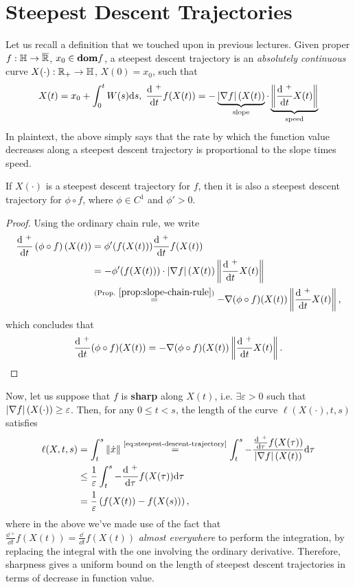 \section{Steepest Descent Trajectories}

Let us recall a definition that we touched upon in previous lectures. Given
proper $f: \mathbb{H} \to \overline{\mathbb{R}}$, $x_0 \in \textbf{dom} f$, a steepest descent
trajectory is an \textit{absolutely continuous} curve $X(\cdot): \mathbb{R}_+ \to
\mathbb{H}$, $X(0) = x_0$, such that
\begin{equation}
	X(t) = x_0 + \int_0^t W(s) \mathrm{d}{s}, \;
	\frac{ \mathrm{d}{~}^+ }{\mathrm{d}{t}} f(X(t)) = -
	\underbrace{\left| \nabla f \right|(X(t))}_{\text{slope}} \cdot
	\underbrace{\left \|  \frac{\mathrm{d}{~}^+}{\mathrm{d}{t}} X(t)  \right \|}_{\text{speed}}
	\label{eq:steepest-descent-trajectory}
\end{equation}
In plaintext, the above simply says that the rate by which the function value
decreases along a steepest descent trajectory is proportional to the slope
times speed.

\begin{cproposition}{}{}
	If $X(\cdot)$ is a steepest descent trajectory for $f$, then it is also a
	steepest descent trajectory for $\phi \circ f$, where $\phi \in C^1$ and
	$\phi' > 0$.
\end{cproposition}
\begin{proof}
	Using the ordinary chain rule, we write
	\begin{align*}
		\frac{\mathrm{d}{~}^+}{\mathrm{d}{t}} \left(\phi \circ f\right)(X(t)) &=
			\phi'(f(X(t))) \frac{\mathrm{d}{~}^{+}}{\mathrm{d}{t}} f(X(t)) \\
			&= -\phi'(f(X(t))) \cdot \left| \nabla f \right|(X(t))
			   \left \| \frac{\mathrm{d}{~}^{+}}{\mathrm{d}{t}} X(t) \right \| \\
			&\overset{(\text{Prop.}~\ref{prop:slope-chain-rule})}{=}
			-\nabla(\phi \circ f)(X(t)) \left \| \frac{\mathrm{d}{~}^{+}}{\mathrm{d}{t}} X(t) \right \|,
	\end{align*}
	which concludes that
	\[
		\frac{\mathrm{d}{~}^+}{\mathrm{d}{t}} (\phi \circ f)(X(t))
		= -\nabla (\phi \circ f)(X(t)) \left \| \frac{\mathrm{d}{~}^{+}}{\mathrm{d}{t}} X(t) \right \|.
	\]
\end{proof}

Now, let us suppose that $f$ is \textbf{sharp} along $X(t)$, i.e. $\exists
\varepsilon > 0$ such that $\left| \nabla f \right|(X(\cdot)) \geq \varepsilon$. Then,
for any $0 \leq t < s$, the length of the curve $\ell(X(\cdot), t, s)$ satisfies
\begin{align*}
	\ell(X, t, s) &= \int_t^s \norm{\dot{x}}
	\overset{\text{\cref{eq:steepest-descent-trajectory}}}{=}
	\int_t^s -\frac{\frac{\dd{~}^{+}}{\dd{\tau}} f(X(\tau))}{\abs{\grad
	f}(X(t))}
		\dd{\tau} \\
		&\leq \frac{1}{\varepsilon} \int_t^s
			-\frac{\dd{~}^+}{\dd{\tau}} f(X(\tau)) \dd{\tau} \\
		&=\frac{1}{\varepsilon} \left(f(X(t)) - f(X(s))\right),
\end{align*}
where in the above we've made use of the fact that $\frac{\dd{~}^{+}}{\dd{t}}
f(X(t))
= \frac{\dd{~}}{\dd{t}} f(X(t))$ \textit{almost everywhere} to perform the
integration, by replacing the integral with the one involving the ordinary
derivative.
Therefore, sharpness gives a uniform bound on the length of steepest descent
trajectories in terms of decrease in function value.

